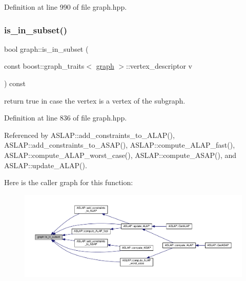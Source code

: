 Definition at line 990 of file graph.\+hpp.

\mbox{\label{structgraph_aad8bebc31ed6aa323c211485c314d8e8}} 
\subsubsection{\texorpdfstring{is\+\_\+in\+\_\+subset()}{is\_in\_subset()}}
{\footnotesize\ttfamily bool graph\+::is\+\_\+in\+\_\+subset (\begin{DoxyParamCaption}\item[{const boost\+::graph\+\_\+traits$<$ \hyperlink{structgraph}{graph} $>$\+::vertex\+\_\+descriptor}]{v }\end{DoxyParamCaption}) const\hspace{0.3cm}{\ttfamily [inline]}}



return true in case the vertex is a vertex of the subgraph. 



Definition at line 836 of file graph.\+hpp.



Referenced by A\+S\+L\+A\+P\+::add\+\_\+constraints\+\_\+to\+\_\+\+A\+L\+A\+P(), A\+S\+L\+A\+P\+::add\+\_\+constraints\+\_\+to\+\_\+\+A\+S\+A\+P(), A\+S\+L\+A\+P\+::compute\+\_\+\+A\+L\+A\+P\+\_\+fast(), A\+S\+L\+A\+P\+::compute\+\_\+\+A\+L\+A\+P\+\_\+worst\+\_\+case(), A\+S\+L\+A\+P\+::compute\+\_\+\+A\+S\+A\+P(), and A\+S\+L\+A\+P\+::update\+\_\+\+A\+L\+A\+P().

Here is the caller graph for this function\+:
\nopagebreak
\begin{figure}[H]
\begin{center}
\leavevmode
\includegraphics[width=350pt]{d5/d15/structgraph_aad8bebc31ed6aa323c211485c314d8e8_icgraph}
\end{center}
\end{figure}
\mbox{\label{structgraph_af941c4f03fca3b040e1bd5f370384360}} 
